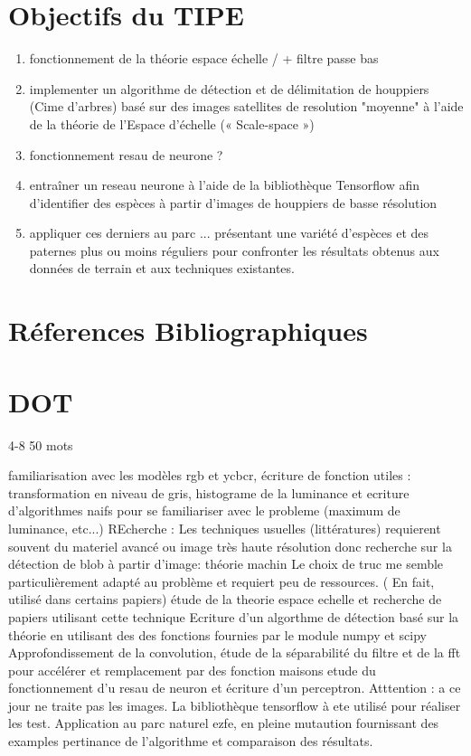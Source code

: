 \documentclass{article}
\begin{document}
\section{Objectifs du TIPE}

\begin{enumerate}
    \item fonctionnement de la théorie espace échelle / + filtre passe bas
	\item implementer un algorithme de détection et de délimitation de houppiers (Cime d'arbres) basé sur des images satellites de resolution "moyenne" à l'aide de la théorie de l'Espace d'échelle (« Scale-space ») 
    \item fonctionnement resau de neurone ?
    \item entraîner un reseau neurone à l'aide de la bibliothèque Tensorflow afin d'identifier des espèces à partir d'images de houppiers de basse résolution 
	\item appliquer ces derniers au parc ... présentant une variété d'espèces et des paternes plus ou moins réguliers pour confronter les résultats obtenus aux données de terrain et aux techniques existantes.    
\end{enumerate}
	

\section{Réferences Bibliographiques}

\section{DOT}
4-8
50 mots

familiarisation avec les modèles rgb et ycbcr, écriture de fonction utiles : transformation en niveau de gris, histograme de la luminance et ecriture d'algorithmes naifs pour se familiariser avec le probleme (maximum de luminance, etc...)
REcherche : Les techniques usuelles (littératures) requierent souvent du materiel avancé ou image très haute résolution donc recherche sur la détection de blob à partir d'image: théorie machin Le choix de truc me semble particulièrement adapté au problème et requiert peu de ressources. ( En fait, utilisé dans certains papiers)
étude de la theorie espace echelle et recherche de papiers utilisant cette technique 
Ecriture d'un algorthme de détection basé sur la théorie en utilisant des des fonctions fournies par le module numpy et scipy 
Approfondissement de la convolution, étude de la séparabilité du filtre et de la fft pour accélérer et remplacement par des fonction maisons 
etude du fonctionnement d'u resau de neuron et écriture d'un perceptron. Atttention : a ce jour ne traite pas les images. La bibliothèque tensorflow à ete utilisé pour réaliser les test.
Application au parc naturel ezfe, en pleine mutaution fournissant des examples pertinance de l'algorithme et  comparaison des résultats.
\end{document}
